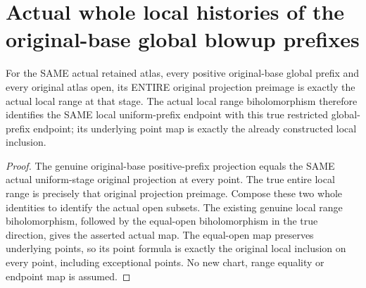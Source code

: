 \section{Actual whole local histories of the original-base global blowup prefixes}

\begin{lemma}
\label{hir:sharp-actual-curve-global-prefix-chart-biholomorphism}
\leanok
For the SAME actual retained atlas, every positive original-base global
prefix and every original atlas open, its ENTIRE original projection
preimage is exactly the actual local range at that stage. The actual local
range biholomorphism therefore identifies the SAME local uniform-prefix
endpoint with this true restricted global-prefix endpoint; its underlying
point map is exactly the already constructed local inclusion.
\end{lemma}
\begin{proof}
The genuine original-base positive-prefix projection equals the SAME
actual uniform-stage original projection at every point. The true entire
local range is precisely that original projection preimage. Compose these
two whole identities to identify the actual open subsets. The existing
genuine local range biholomorphism, followed by the equal-open
biholomorphism in the true direction, gives the asserted actual map. The
equal-open map preserves underlying points, so its point formula is
exactly the original local inclusion on every point, including exceptional
points. No new chart, range equality or endpoint map is assumed.
\end{proof}

